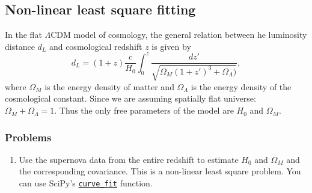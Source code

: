 \subsection{Non-linear least square fitting}

In the flat $\Lambda$CDM model of cosmology, the general relation between he luminosity distance $d_L$ and cosmological redshift $z$ is given by 
\begin{equation} 
d_L = (1+z) \frac{c}{H_0} \int_0^z \frac{dz'}{\sqrt{\Omega_M(1+z')^3 + \Omega_\Lambda)}}, 
\label{eq:lcdm}
\end{equation} 
where $\Omega_M$ is the energy density of matter and $\Omega_\Lambda$ is the energy density of the cosmological constant. Since we are assuming spatially flat universe: $\Omega_M +\Omega_\Lambda = 1$. Thus the only free parameters of the model are $H_0$ and $\Omega_M$. 

\subsubsection{Problems}

\begin{enumerate}
\item Use the supernova data from the entire redshift to estimate $H_0$ and $\Omega_M$ and the corresponding covariance. This is a non-linear least square problem. You can use SciPy's \href{https://docs.scipy.org/doc/scipy/reference/generated/scipy.optimize.curve_fit.html}{\texttt{curve\_fit}} function. 
\end{enumerate}
